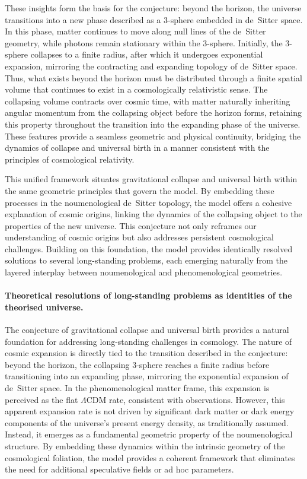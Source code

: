\documentclass[aps,rmp,groupedaddress,twocolumn,10pt]{revtex4-2}
\begin{document}
These insights form the basis for the conjecture: beyond the horizon, the universe transitions into a new phase described as a 3-sphere embedded in de~Sitter space. In this phase, matter continues to move along null lines of the de~Sitter geometry, while photons remain stationary within the 3-sphere. Initially, the 3-sphere collapses to a finite radius, after which it undergoes exponential expansion, mirroring the contracting and expanding topology of de~Sitter space. Thus, what exists beyond the horizon must be distributed through a finite spatial volume that continues to exist in a cosmologically relativistic sense. The collapsing volume contracts over cosmic time, with matter naturally inheriting angular momentum from the collapsing object before the horizon forms, retaining this property throughout the transition into the expanding phase of the universe. These features provide a seamless geometric and physical continuity, bridging the dynamics of collapse and universal birth in a manner consistent with the principles of cosmological relativity.

This unified framework situates gravitational collapse and universal birth within the same geometric principles that govern the model. By embedding these processes in the noumenological de~Sitter topology, the model offers a cohesive explanation of cosmic origins, linking the dynamics of the collapsing object to the properties of the new universe. This conjecture not only reframes our understanding of cosmic origins but also addresses persistent cosmological challenges. Building on this foundation, the model provides identically resolved solutions to several long-standing problems, each emerging naturally from the layered interplay between noumenological and phenomenological geometries.

\paragraph{Theoretical resolutions of long-standing problems as identities of the theorised universe.}
The conjecture of gravitational collapse and universal birth provides a natural foundation for addressing long-standing challenges in cosmology. The nature of cosmic expansion is directly tied to the transition described in the conjecture: beyond the horizon, the collapsing 3-sphere reaches a finite radius before transitioning into an expanding phase, mirroring the exponential expansion of de~Sitter space. In the phenomenological matter frame, this expansion is perceived as the flat $\Lambda$CDM rate, consistent with observations. However, this apparent expansion rate is not driven by significant dark matter or dark energy components of the universe's present energy density, as traditionally assumed. Instead, it emerges as a fundamental geometric property of the noumenological structure. By embedding these dynamics within the intrinsic geometry of the cosmological foliation, the model provides a coherent framework that eliminates the need for additional speculative fields or ad hoc parameters.
\end{document}
